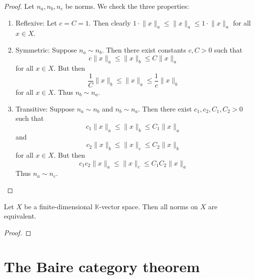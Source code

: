 \documentclass[11pt]{article}
\numberwithin{equation}{section}
\theoremstyle{definition}
\theoremstyle{definition}
\newcommand\norm[1]{\lVert#1\rVert}
\newcommand{\1}{\mathbbm 1}
\begin{document}
\begin{theorem}
\end{theorem}
\begin{proof}
	Let $n_a,n_b,n_c$ be norms. We check the three properties:
	\begin{enumerate}
		\item Reflexive: Let $c=C=1$. Then clearly $1 \cdot \norm{x}_a \leq \norm{x}_a \leq 1 \cdot \norm{x}_a$ for all $x \in X$. 
		\item Symmetric: Suppose $n_a \sim n_b$. Then there exist constants $c,C > 0$ such that 
		\begin{equation}
			c\norm{x}_a \leq \norm{x}_b \leq C\norm{x}_a
		\end{equation}
		for all $x \in X$. But then
		\begin{equation}
			\frac{1}{C} \norm{x}_b \leq \norm{x}_a \leq \frac{1}{c}\norm{x}_b
		\end{equation}
		for all $x \in X$. Thus $n_b \sim n_a$.
		\item Transitive: Suppose $n_a \sim n_b$ and $n_b \sim n_a$. Then there exist $c_1,c_2,C_1,C_2>0$ such that
		\begin{equation}
			c_1\norm{x}_a \leq \norm{x}_b \leq C_1\norm{x}_a
		\end{equation}
		and
		\begin{equation}
			c_2\norm{x}_b \leq \norm{x}_c \leq C_2\norm{x}_b
		\end{equation}
		for all $x \in X$. But then
		\begin{equation}
			c_1 c_2 \norm{x}_a \leq \norm{x}_c \leq C_1C_2\norm{x}_a
		\end{equation}
		Thus $n_a \sim n_c$.
	\end{enumerate}
\end{proof}

\begin{theorem}
	Let $X$ be a finite-dimensional $\mathbb{K}$-vector space. Then all norms on $X$ are equivalent. 
\end{theorem}
\begin{proof}
	
\end{proof}



\section{The Baire category theorem}
\end{document}
